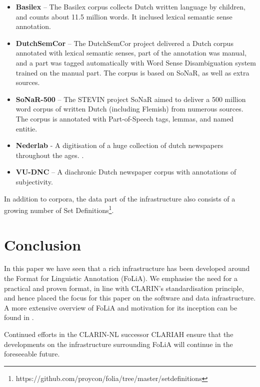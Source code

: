 \documentclass[a4paper,10pt,twoside]{article}
\begin{document}
\begin{itemize}
    \item \textbf{Basilex} -- The Basilex corpus collects Dutch written language by children,
        and counts about 11.5 million words. It inclused lexical semantic sense
        annotation.\cite{BASILEX}
    \item \textbf{DutchSemCor} -- The DutchSemCor project delivered a Dutch corpus annotated
        with lexical semantic senses, part of the annotation was manual, and a
        part was tagged automatically with Word Sense Disambiguation system trained on
        the manual part. The corpus is based on SoNaR, as well as extra
        sources. \cite{DUTCHSEMCOR}
    \item \textbf{SoNaR-500} --  The STEVIN project SoNaR aimed to deliver a 500 million
        word corpus of written Dutch (including Flemish) from numerous sources.
        The corpus is annotated with Part-of-Speech tags, lemmas, and named
        entitie. \cite{SONAR}
    \item \textbf{Nederlab} - A digitisation of a huge collection of dutch
        newspapers throughout the ages. \cite{NEDERLAB}.
    \item \textbf{VU-DNC} -- A diachronic Dutch newspaper corpus with annotations of
        subjectivity.\cite{VUDNC}
\end{itemize}

In addition to corpora, the data part of the infrastructure also consists of a
growing number of Set
Definitions\footnote{https://github.com/proycon/folia/tree/master/setdefinitions}.

\section{Conclusion}

In this paper we have seen that a rich infrastructure has been developed around
the Format for Linguistic Annotation (FoLiA). We emphasise the need for a
practical and proven format, in line with CLARIN's standardisation principle,
and hence placed the focus for this paper on the software and data
infrastructure. A more extensive overview of FoLiA and motivation for its
inception can be found in \cite{FOLIAPAPER}.

Continued efforts in the
CLARIN-NL successor CLARIAH ensure that the developments on the infrastructure
surrounding FoLiA will continue in the foreseeable future.


 
  
\end{document}
